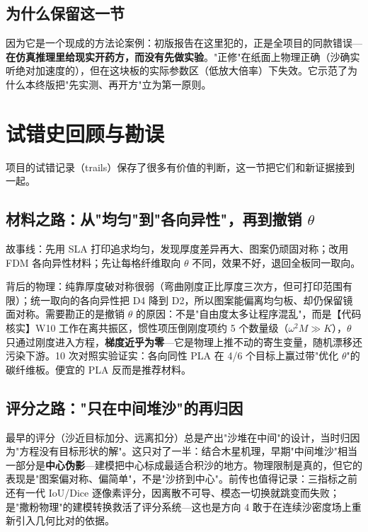 \documentclass[11pt,a4paper]{article}
\begin{document}
\subsection{为什么保留这一节}

因为它是一个现成的方法论案例：初版报告在这里犯的，正是全项目的同款错误---\textbf{在仿真推理里给现实开药方，而没有先做实验}。"正修"在纸面上物理正确（沙确实听绝对加速度的），但在这块板的实际参数区（低放大倍率）下失效。它示范了为什么本终版把"先实测、再开方"立为第一原则。

\section{试错史回顾与勘误}

项目的试错记录（trails）保存了很多有价值的判断，这一节把它们和新证据接到一起。

\subsection{材料之路：从"均匀"到"各向异性"，再到撤销 $\theta$}

故事线：先用 SLA 打印追求均匀，发现厚度差异再大、图案仍顽固对称；改用 FDM 各向异性材料；先让每格纤维取向 $\theta$ 不同，效果不好，退回全板同一取向。

背后的物理：纯靠厚度破对称很弱（弯曲刚度正比厚度三次方，但可打印范围有限）；统一取向的各向异性把 D4 降到 D2，所以图案能偏离均匀板、却仍保留镜面对称。需要勘正的是撤销 $\theta$ 的原因：不是"自由度太多让程序混乱"，而是【代码核实】W10 工作在离共振区，惯性项压倒刚度项约 5 个数量级（$\omega^2 M \gg K$），$\theta$ 只通过刚度进入方程，\textbf{梯度近乎为零}---它是物理上推不动的寄生变量，随机漂移还污染下游。10 次对照实验证实：各向同性 PLA 在 4/6 个目标上赢过带"优化 $\theta$"的碳纤维板。便宜的 PLA 反而是推荐材料。

\subsection{评分之路："只在中间堆沙"的再归因}

最早的评分（沙近目标加分、远离扣分）总是产出"沙堆在中间"的设计，当时归因为"方程没有目标形状的解"。这只对了一半：结合木星机理，早期"中间堆沙"相当一部分是\textbf{中心伪影}---建模把中心标成最适合积沙的地方。物理限制是真的，但它的表现是"图案偏对称、偏简单"，不是"沙挤到中心"。前传也值得记录：三指标之前还有一代 IoU/Dice 逐像素评分，因离散不可导、模态一切换就跳变而失败；是"撒粉物理"的建模转换救活了评分系统---这也是方向 4 敢于在连续沙密度场上重新引入几何比对的依据。
\end{document}

